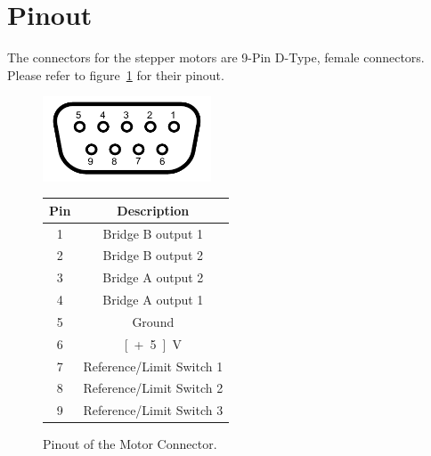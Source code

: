 \section{Pinout}
The connectors for the stepper motors are 9-Pin D-Type, female connectors. Please refer to figure~\ref{pin_out} for their pinout.

\begin{figure}[h]
\begin{center}
\begin{minipage}[h]{5cm}
\includegraphics[width=5cm]{grafiken/Numbered_DE9_female_Diagram.pdf}
\end{minipage}
\hfill
\begin{minipage}[h]{5cm}
\begin{tabular}{|c|c|}
\hline 
\textbf{Pin} & \textbf{Description} \\ \hline 
1 & Bridge B output 1 \\ \hline 
2 & Bridge B output 2 \\ \hline 
3 & Bridge A output 2 \\ \hline 
4 & Bridge A output 1 \\ \hline 
5 & Ground \\ \hline 
6 & \unit[+5]{V} \\ \hline 
7 & Reference/Limit Switch 1 \\ \hline 
8 & Reference/Limit Switch 2 \\ \hline 
9 & Reference/Limit Switch 3 \\ \hline 
\end{tabular}
\end{minipage}
\end{center}
\caption[Pinout of the Motor Connector.]{Pinout of the Motor Connector.}
\label{pin_out}
\end{figure}










\newpage
